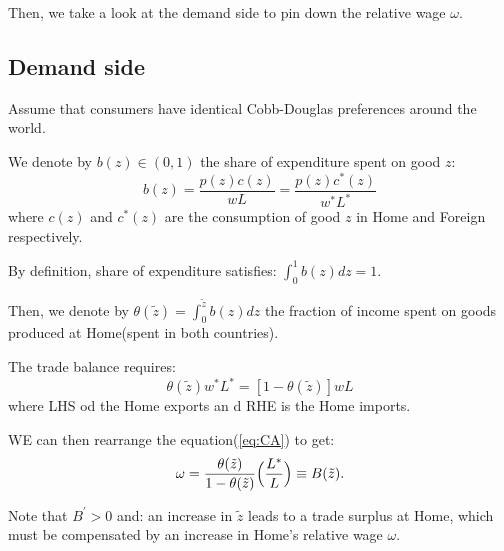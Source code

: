 Then, we take a look at the demand side to pin down the relative wage $\omega$.
\subsection{Demand side}

Assume that consumers have identical Cobb-Douglas preferences around the world.

We denote by $b(z) \in (0,1)$ the share of expenditure spent on good $z$:
\[b(z) = \frac{p(z) c(z)}{wL} = \frac{p(z)c^*(z)}{w^* L^*}\]
where $c(z)$ and $c^*(z)$ are the consumption of good $z$ in Home and Foreign respectively.

By definition, share of expenditure satisfies: $\int_{0}^{1} b(z) dz = 1$.

Then, we denote by $\theta(\tilde{z}) = \int_0^{\tilde{z}} b(z) dz$ the fraction of income spent
on goods produced at Home(spent in both countries).

The trade balance requires: 
\[\theta(\tilde{z}) w^* L^* = [1-\theta (\tilde{z})]wL\]
where LHS od the Home exports an d RHE is the Home imports.

WE can then rearrange the equation(\ref{eq:CA}) to get:
\begin{equation}
    \omega  = \frac{\theta(\tilde{z})}{1 - \theta(\tilde{z})}\Bigl(\frac{L^*}{L}\Bigr) \equiv B(\tilde{z}).
\end{equation}

Note that $B^{\prime} > 0$ and: an increase in $\tilde{z}$ leads to a trade surplus at Home,
which must be compensated by an increase in Home's relative wage $\omega$.


